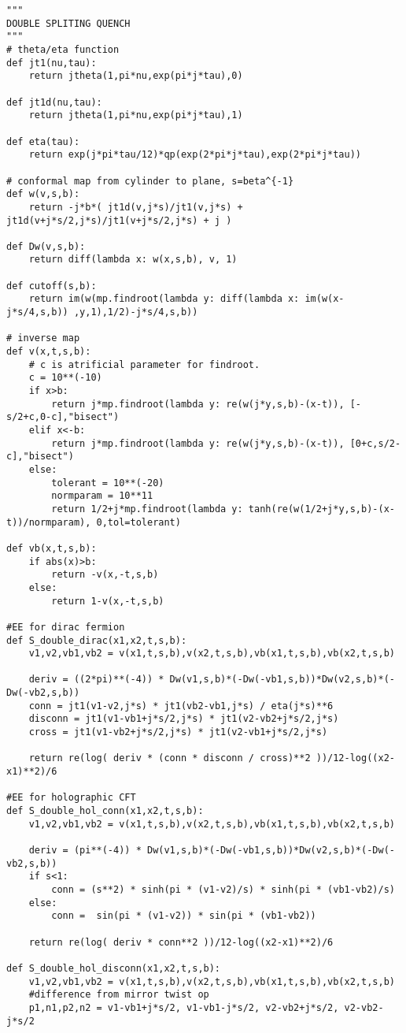 \begin{lstlisting}
"""
DOUBLE SPLITING QUENCH
"""
# theta/eta function
def jt1(nu,tau):
	return jtheta(1,pi*nu,exp(pi*j*tau),0)

def jt1d(nu,tau):
	return jtheta(1,pi*nu,exp(pi*j*tau),1)

def eta(tau):
	return exp(j*pi*tau/12)*qp(exp(2*pi*j*tau),exp(2*pi*j*tau))

# conformal map from cylinder to plane, s=beta^{-1}
def w(v,s,b):
	return -j*b*( jt1d(v,j*s)/jt1(v,j*s) + jt1d(v+j*s/2,j*s)/jt1(v+j*s/2,j*s) + j )

def Dw(v,s,b):
	return diff(lambda x: w(x,s,b), v, 1)

def cutoff(s,b):
	return im(w(mp.findroot(lambda y: diff(lambda x: im(w(x-j*s/4,s,b)) ,y,1),1/2)-j*s/4,s,b))

# inverse map
def v(x,t,s,b):
	# c is atrificial parameter for findroot.
	c = 10**(-10)
	if x>b:
		return j*mp.findroot(lambda y: re(w(j*y,s,b)-(x-t)), [-s/2+c,0-c],"bisect")
	elif x<-b:
		return j*mp.findroot(lambda y: re(w(j*y,s,b)-(x-t)), [0+c,s/2-c],"bisect")
	else:
		tolerant = 10**(-20)
		normparam = 10**11
		return 1/2+j*mp.findroot(lambda y: tanh(re(w(1/2+j*y,s,b)-(x-t))/normparam), 0,tol=tolerant)

def vb(x,t,s,b):
	if abs(x)>b:
		return -v(x,-t,s,b)
	else:
		return 1-v(x,-t,s,b)

#EE for dirac fermion
def S_double_dirac(x1,x2,t,s,b):
	v1,v2,vb1,vb2 = v(x1,t,s,b),v(x2,t,s,b),vb(x1,t,s,b),vb(x2,t,s,b)

	deriv = ((2*pi)**(-4)) * Dw(v1,s,b)*(-Dw(-vb1,s,b))*Dw(v2,s,b)*(-Dw(-vb2,s,b))
	conn = jt1(v1-v2,j*s) * jt1(vb2-vb1,j*s) / eta(j*s)**6
	disconn = jt1(v1-vb1+j*s/2,j*s) * jt1(v2-vb2+j*s/2,j*s)
	cross = jt1(v1-vb2+j*s/2,j*s) * jt1(v2-vb1+j*s/2,j*s)

	return re(log( deriv * (conn * disconn / cross)**2 ))/12-log((x2-x1)**2)/6

#EE for holographic CFT
def S_double_hol_conn(x1,x2,t,s,b):
	v1,v2,vb1,vb2 = v(x1,t,s,b),v(x2,t,s,b),vb(x1,t,s,b),vb(x2,t,s,b)

	deriv = (pi**(-4)) * Dw(v1,s,b)*(-Dw(-vb1,s,b))*Dw(v2,s,b)*(-Dw(-vb2,s,b))
	if s<1:
		conn = (s**2) * sinh(pi * (v1-v2)/s) * sinh(pi * (vb1-vb2)/s)
	else:
		conn =  sin(pi * (v1-v2)) * sin(pi * (vb1-vb2))

	return re(log( deriv * conn**2 ))/12-log((x2-x1)**2)/6

def S_double_hol_disconn(x1,x2,t,s,b):
	v1,v2,vb1,vb2 = v(x1,t,s,b),v(x2,t,s,b),vb(x1,t,s,b),vb(x2,t,s,b)
	#difference from mirror twist op
	p1,n1,p2,n2 = v1-vb1+j*s/2, v1-vb1-j*s/2, v2-vb2+j*s/2, v2-vb2-j*s/2


\end{lstlisting}
